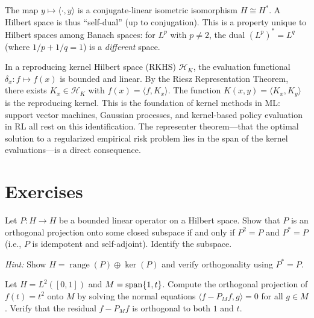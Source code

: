 \documentclass[11pt,a4paper]{article}
\begin{document}
\begin{keyresult}[title={Riesz Representation -- A Hilbert Space is Self-Dual}]
The map $y \mapsto \langle \cdot, y \rangle$ is a conjugate-linear
isometric isomorphism $H \cong H^*$. A Hilbert space is thus
``self-dual'' (up to conjugation). This is a property unique to Hilbert
spaces among Banach spaces: for $L^p$ with $p \neq 2$, the dual
$(L^p)^* = L^q$ (where $1/p + 1/q = 1$) is a \emph{different} space.
\end{keyresult}

\begin{rlconnection}[title={Riesz Representation and Kernel Methods}]
In a reproducing kernel Hilbert space (RKHS) $\mathcal{H}_K$, the
evaluation functional $\delta_x \colon f \mapsto f(x)$ is bounded and
linear. By the Riesz Representation Theorem, there exists
$K_x \in \mathcal{H}_K$ with $f(x) = \langle f, K_x \rangle$. The
function $K(x, y) = \langle K_x, K_y \rangle$ is the reproducing
kernel. This is the foundation of kernel methods in ML: support vector
machines, Gaussian processes, and kernel-based policy evaluation in RL
all rest on this identification. The representer theorem---that the
optimal solution to a regularized empirical risk problem lies in the
span of the kernel evaluations---is a direct consequence.
\end{rlconnection}


\section{Exercises}
\label{sec:exercises}

\begin{exercise}
\label{ex:proj-characterization}
Let $P \colon H \to H$ be a bounded linear operator on a Hilbert space.
Show that $P$ is an orthogonal projection onto some closed subspace if
and only if $P^2 = P$ and $P^* = P$ (i.e., $P$ is idempotent and
self-adjoint). Identify the subspace.

\noindent\textit{Hint:} Show $H = \operatorname{range}(P) \oplus \ker(P)$ and
verify orthogonality using $P^* = P$.
\end{exercise}

\begin{exercise}
\label{ex:proj-polynomial}
Let $H = L^2([0,1])$ and $M = \operatorname{span}\{1, t\}$. Compute the orthogonal
projection of $f(t) = t^2$ onto $M$ by solving the normal equations
$\langle f - P_M f, g \rangle = 0$ for all $g \in M$. Verify that the
residual $f - P_M f$ is orthogonal to both $1$ and $t$.
\end{exercise}
\end{document}
